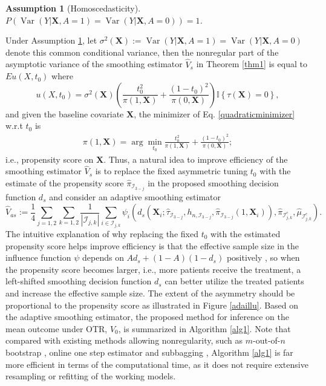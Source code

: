 \documentclass[11pt]{article}
\theoremstyle{referenceplain}
\newtheorem{Assumption}{Assumption}
\theoremstyle{referencedefinition}
\theoremstyle{referenceremark}
\begin{document}
\begin{Assumption}[Homoscedasticity]\label{A8}
     $P\left(\operatorname{Var}(Y|\mathbf{X},A=1)=\operatorname{Var}(Y|\mathbf{X},A=0)\right)=1$. 
\end{Assumption}
Under Assumption \ref{A8}, {let $\sigma^2(\mathbf{X}):=\operatorname{Var}(Y|\mathbf{X},A=1)=\operatorname{Var}(Y|\mathbf{X},A=0)$ denote this common conditional variance, then} the nonregular part of the asymptotic variance of the smoothing estimator $\widehat{V}_s$ in Theorem \ref{thm1} is equal to $E u(X,t_0)$ where
\begin{equation}\label{quadraticminimizer}
   u(X,t_0)={\sigma^2(\mathbf{X})}\left(\frac{t_0^2}{\pi\left(1, \mathbf{X}\right)}+\frac{(1-t_0)^2}{\pi\left(0, \mathbf{X}\right)}\right) \mathbb{I}\left\{\tau\left(\mathbf{X}\right)=0\right\},
\end{equation}
and given the baseline covariate $\mathbf{X}$, the minimizer of Eq. \eqref{quadraticminimizer} w.r.t $t_0$ is 
\begin{align}
    \pi(1,\mathbf{X})=\arg\min_{t_0}\frac{t_0^2}{\pi\left(1, \mathbf{X}\right)}+\frac{(1-t_0)^2}{\pi\left(0, \mathbf{X}\right)};
\end{align}
i.e., propensity score on $\mathbf{X}$. Thus, a natural idea to improve efficiency of the smoothing estimator $\widehat{V}_{s}$ is to replace the fixed asymmetric tuning $t_0$ with the estimate of the propensity score $\widehat{\pi}_{\mathcal{I}_{3-j}}$ in the proposed smoothing decision function ${d_s}$ and consider an adaptive smoothing estimator
\begin{equation}
   \widehat{V}_{as}:= \frac{1}{4}\sum_{j=1,2}\sum_{k=1,2}\frac{1}{|\mathcal{I}_{j,k}|}\sum_{i\in\mathcal{I}_{j,k}}\psi_i(d_{s}(\mathbf{X}_i;\widehat{\tau}_{\mathcal{I}_{3-j}},h_{n,\mathcal{I}_{3-j}},\widehat{\pi}_{\mathcal{I}_{3-j}}(1,\mathbf{X}_i)),\widehat{\pi}_{\mathcal{I}_{j,k}^c},\widehat{\mu}_{\mathcal{I}_{j,k}^c}). 
\end{equation}
The intuitive explanation of why replacing the fixed $t_0$ with the estimated propensity score helps improve efficiency is that the effective sample size in the influence function $\psi$ depends on $Ad_{s}+(1-A)(1-d_{s})$ positively \citep{2024Effective}, so when the propensity score becomes larger, i.e., more patients receive the treatment, a left-shifted smoothing decision function $d_{s}$ can better utilize the treated patients and increase the effective sample size. The extent of the asymmetry should be proportional to the propensity score as illustrated in Figure \ref{adaillu}. Based on the adaptive smoothing estimator, the proposed method for inference on the mean outcome under OTR, $V_0$, is summarized in Algorithm \ref{alg1}. Note that compared with existing methods allowing nonregularity, such as $m$-out-of-$n$ bootstrap \citep{chakraborty2010inference,chakraborty2014inference}, online one step estimator \citep{luedtke2016statistical} and subbagging \citep{shi2020breaking}, Algorithm \ref{alg1} is far more efficient in terms of the computational time, as it does not require extensive resampling or refitting of the working models.
\end{document}
